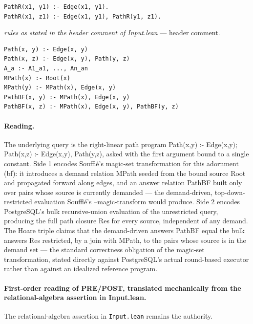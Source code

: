 \documentclass[10pt]{article}
\begin{document}
\begin{Verbatim}[fontsize=\scriptsize,breaklines=true,breakanywhere=true,frame=single,framesep=1.5mm]
PathR(x1, y1) :- Edge(x1, y1).
PathR(x1, z1) :- Edge(x1, y1), PathR(y1, z1).
\end{Verbatim}

{\raggedright\textit{rules as stated in the header comment of Input.lean} --- header comment.\par}

\begin{Verbatim}[fontsize=\scriptsize,breaklines=true,breakanywhere=true,frame=single,framesep=1.5mm]
Path(x, y) :- Edge(x, y)
Path(x, z) :- Edge(x, y), Path(y, z)
A_a :- A1_a1, ..., An_an
MPath(x) :- Root(x)
MPath(y) :- MPath(x), Edge(x, y)
PathBF(x, y) :- MPath(x), Edge(x, y)
PathBF(x, z) :- MPath(x), Edge(x, y), PathBF(y, z)
\end{Verbatim}

\paragraph{Reading.} The underlying query is the right-linear path program Path(x,y) :- Edge(x,y); Path(x,z) :- Edge(x,y), Path(y,z), asked with the first argument bound to a single constant. Side 1 encodes Soufflé's magic-set transformation for this adornment (bf): it introduces a demand relation MPath seeded from the bound source Root and propagated forward along edges, and an answer relation PathBF built only over pairs whose source is currently demanded --- the demand-driven, top-down-restricted evaluation Soufflé's --magic-transform would produce. Side 2 encodes PostgreSQL's bulk recursive-union evaluation of the unrestricted query, producing the full path closure Res for every source, independent of any demand. The Hoare triple claims that the demand-driven answers PathBF equal the bulk answers Res restricted, by a join with MPath, to the pairs whose source is in the demand set --- the standard correctness obligation of the magic-set transformation, stated directly against PostgreSQL's actual round-based executor rather than against an idealized reference program.

\paragraph{First-order reading of PRE/POST, translated mechanically from the relational-algebra assertion in Input.lean.} The relational-algebra assertion in \texttt{Input.lean} remains the authority.
\end{document}
